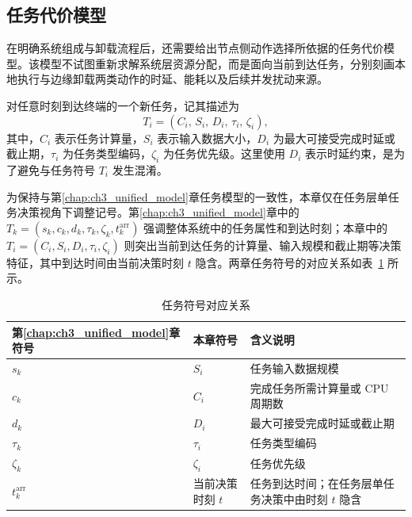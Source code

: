 \subsection{任务代价模型}

在明确系统组成与卸载流程后，还需要给出节点侧动作选择所依据的任务代价模型。该模型不试图重新求解系统层资源分配，而是面向当前到达任务，分别刻画本地执行与边缘卸载两类动作的时延、能耗以及后续并发扰动来源。

对任意时刻到达终端的一个新任务，记其描述为
\begin{equation}
    T_i = \left(C_i,\, S_i,\, D_i,\, \tau_i,\, \zeta_i \right),
    \label{eq:ch5_task_tuple}
\end{equation}
其中，$C_i$ 表示任务计算量，$S_i$ 表示输入数据大小，$D_i$ 为最大可接受完成时延或截止期，$\tau_i$ 为任务类型编码，$\zeta_i$ 为任务优先级。这里使用 $D_i$ 表示时延约束，是为了避免与任务符号 $T_i$ 发生混淆。

为保持与第\ref{chap:ch3_unified_model}章任务模型的一致性，本章仅在任务层单任务决策视角下调整记号。第\ref{chap:ch3_unified_model}章中的 $T_k=(s_k,c_k,d_k,\tau_k,\zeta_k,t_k^{\mathrm{arr}})$ 强调整体系统中的任务属性和到达时刻；本章中的 $T_i=(C_i,S_i,D_i,\tau_i,\zeta_i)$ 则突出当前到达任务的计算量、输入规模和截止期等决策特征，其中到达时间由当前决策时刻 $t$ 隐含。两章任务符号的对应关系如表~\ref{tab:ch5_task_symbol_mapping} 所示。

\begin{table}[H]
    \centering
    \caption{任务符号对应关系}
    \label{tab:ch5_task_symbol_mapping}
    \begin{tabular}{p{3.0cm}p{3.0cm}p{5.5cm}}
        \toprule
        第\ref{chap:ch3_unified_model}章符号 & 本章符号       & 含义说明                        \\
        \midrule
        $s_k$                            & $S_i$      & 任务输入数据规模                    \\
        $c_k$                            & $C_i$      & 完成任务所需计算量或 CPU 周期数          \\
        $d_k$                            & $D_i$      & 最大可接受完成时延或截止期               \\
        $\tau_k$                         & $\tau_i$   & 任务类型编码                      \\
        $\zeta_k$                        & $\zeta_i$  & 任务优先级                       \\
        $t_k^{\mathrm{arr}}$             & 当前决策时刻 $t$ & 任务到达时间；在任务层单任务决策中由时刻 $t$ 隐含 \\
        \bottomrule
    \end{tabular}
\end{table}

